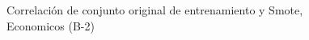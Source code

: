 \begin{figure}[H]
    \centering
    
    \caption{Correlación de conjunto original de entrenamiento y Smote, Economicos (B-2)}
    \label{pairwise-economicos-b-2-smote-enc}
\end{figure}